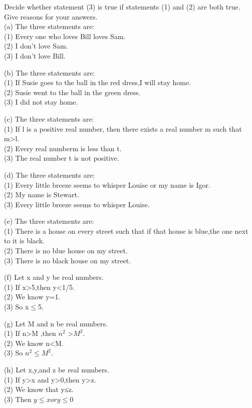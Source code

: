 \documentclass[11pt, a4paper, UTF8]{ctexart}
\begin{document}
\begin{problem}[UD:4.13]
Decide whether statement (3) is true if statements (1) and (2) are both true. Give reasons for your answers.\\
(a) The three statements are:\\
(1) Every one who loves Bill loves Sam. \\
(2) I don’t love Sam.\\
(3) I don’t love Bill.


(b) The three statements are:\\
(1) If Susie goes to the ball in the red dress,I will stay home.\\
(2) Susie went to the ball in the green dress.\\
(3) I did not stay home.


(c) The three statements are:\\
(1) If l is a positive real number, then there exists a real number m such that m>l.\\
(2) Every real numberm is less than t.\\
(3) The real number t is not positive.


(d) The three statements are:\\
(1) Every little breeze seems to whisper Louise or my name is Igor. \\
(2) My name is Stewart.\\
(3) Every little breeze seems to whisper Louise.


(e) The three statements are:\\
(1) There is a house on every street such that if that house is blue,the one next to it is black.\\
(2) There is no blue house on my street. \\
(3) There is no black house on my street.


(f) Let x and y be real numbers.\\
(1) If x>5,then y<1/5. \\
(2) We know y=1.\\
(3) So x$\le$5.


(g) Let M and n be real numbers.\\
(1) If n>M ,then $n^2$ >$M^2$.\\ 
(2) We know n<M.\\
(3) So $n^2 \le M^2$.


(h) Let x,y,and z be real numbers.\\
(1) If y>x and y>0,then y>z.\\ 
(2) We know that y≤z.\\
(3) Then $y \le x or y\le 0$
\end{problem}
\end{document}
